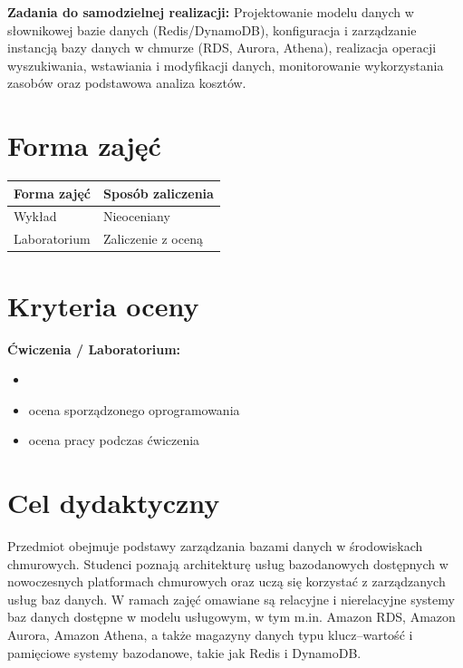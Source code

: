 \documentclass[12pt, a4paper]{article}
\newcommand{\thdrule}{\noalign{\global\setlength{\extrarowheight}{0pt}}}
\newcommand{\thdend}{\noalign{\global\setlength{\extrarowheight}{3pt}}}
\begin{document}
\vspace{4pt}
\noindent\textbf{Zadania do samodzielnej realizacji:} Projektowanie modelu danych w słownikowej bazie danych (Redis/DynamoDB), konfiguracja i zarządzanie instancją bazy danych w chmurze (RDS, Aurora, Athena), realizacja operacji wyszukiwania, wstawiania i modyfikacji danych, monitorowanie wykorzystania zasobów oraz podstawowa analiza kosztów.

\section{Forma zajęć}

\begin{center}
{\scriptsize
\begin{tabular}{m{5cm}m{8cm}}
\thdrule\toprule
\rowcolor{pjatkRed} {\color{white}\textbf{Forma zajęć}} & {\color{white}\textbf{Sposób zaliczenia}} \\
\midrule\thdend
  \rowcolor{tableRowLight} Wykład & Nieoceniany \\
  \rowcolor{tableRowAlt} Laboratorium & Zaliczenie z oceną \\
\bottomrule
\end{tabular}}
\end{center}

\section{Kryteria oceny}

\textbf{Ćwiczenia / Laboratorium:}
\begin{itemize}
  \item 
  \item ocena sporządzonego oprogramowania
  \item ocena pracy podczas ćwiczenia
\end{itemize}


\section{Cel dydaktyczny}

Przedmiot obejmuje podstawy zarządzania bazami danych w środowiskach chmurowych. Studenci poznają architekturę usług bazodanowych dostępnych w nowoczesnych platformach chmurowych oraz uczą się korzystać z zarządzanych usług baz danych. W ramach zajęć omawiane są relacyjne i nierelacyjne systemy baz danych dostępne w modelu usługowym, w tym m.in. Amazon RDS, Amazon Aurora, Amazon Athena, a także magazyny danych typu klucz–wartość i pamięciowe systemy bazodanowe, takie jak Redis i DynamoDB.
\end{document}
